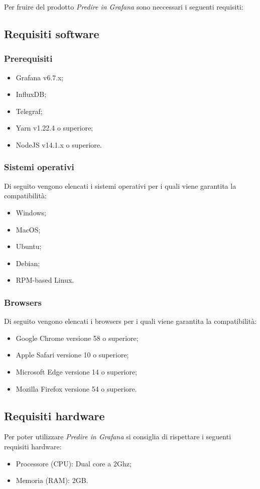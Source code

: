 \documentclass[../manuale-utente.tex]{subfiles}
\begin{document}
Per fruire del prodotto \textit{Predire in Grafana} sono neccessari i seguenti requisiti:

\subsection{Requisiti software}%
\label{subs:requisiti_softwaree}

\subsubsection{Prerequisiti}%
\label{sssec:prerequisiti}

\begin{itemize}
  \item Grafana v6.7.x;
  \item InfluxDB;
  \item Telegraf;
  \item Yarn v1.22.4 o superiore;
  \item NodeJS v14.1.x o superiore.
\end{itemize}

\subsubsection{Sistemi operativi}%
\label{sssec:sistemi_operativi}
Di seguito vengono elencati i sistemi operativi per i quali viene garantita la compatibilità:
\begin{itemize}
  \item Windows;
  \item MacOS;
  \item Ubuntu;
  \item Debian;
  \item RPM-based Linux.
\end{itemize}

\subsubsection{Browsers}%
\label{sssub:browsers}
Di seguito vengono elencati i browsers per i quali viene garantita la compatibilità:
\begin{itemize}
  \item Google Chrome versione 58 o superiore;
  \item Apple Safari versione 10 o superiore;
  \item Microsoft Edge versione 14 o superiore;
  \item Mozilla Firefox versione 54 o superiore.
\end{itemize}

\subsection{Requisiti hardware}%
\label{subs:requisiti_hardware}

Per poter utilizzare \textit{Predire in Grafana} si consiglia di rispettare i seguenti requisiti hardware:

\begin{itemize}
  \item Processore (CPU): Dual core a 2Ghz;
  \item Memoria (RAM): 2GB.
\end{itemize}
\end{document}

